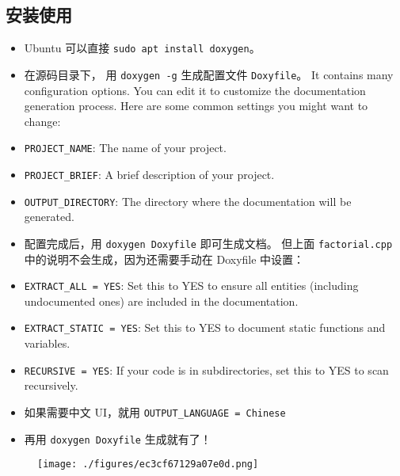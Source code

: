 \subsection{安装使用}
\begin{itemize}
\item Ubuntu 可以直接 \verb`sudo apt install doxygen`。
\item 在源码目录下， 用 \verb`doxygen -g` 生成配置文件 \verb`Doxyfile`。 It contains many configuration options. You can edit it to customize the documentation generation process. Here are some common settings you might want to change:
\item \verb`PROJECT_NAME`: The name of your project.
\item \verb`PROJECT_BRIEF`: A brief description of your project.
\item \verb`OUTPUT_DIRECTORY`: The directory where the documentation will be generated.
\item 配置完成后，用 \verb`doxygen Doxyfile` 即可生成文档。 但上面 \verb`factorial.cpp` 中的说明不会生成，因为还需要手动在 Doxyfile 中设置：
\item \verb`EXTRACT_ALL = YES`: Set this to YES to ensure all entities (including undocumented ones) are included in the documentation.
\item \verb`EXTRACT_STATIC = YES`: Set this to YES to document static functions and variables.
\item \verb`RECURSIVE = YES`: If your code is in subdirectories, set this to YES to scan recursively.
\item 如果需要中文 UI，就用 \verb`OUTPUT_LANGUAGE = Chinese`
\item 再用 \verb`doxygen Doxyfile` 生成就有了！
\end{itemize}

\begin{figure}[ht]
\centering
\texttt{[image: ./figures/ec3cf67129a07e0d.png]}
\caption{} \label{fig_doxyge_1}
\end{figure}